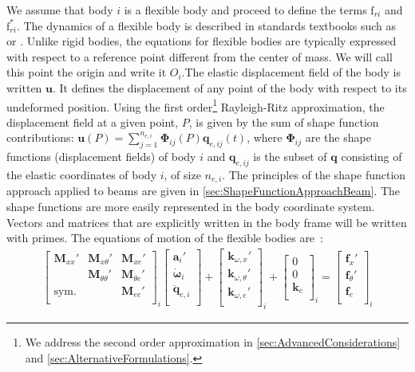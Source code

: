 \documentclass[wes, manuscript]{copernicus}
\renewcommand{\v}[1]{\boldsymbol{#1}}
\newcommand{\m}[1]{\boldsymbol{#1}}
\newcommand{\M} {{\m{M}}}
\newcommand{\kanef}{\mathrm{f}}
\begin{document}
We assume that body $i$ is a flexible body and proceed to define the terms $\kanef_{ri}$ and $\kanef_{ri}^*$.
The dynamics of a flexible body is described in standards textbooks 
such as \cite{shabana:book} or \cite{Schwertassek:book}.
Unlike rigid bodies, the equations for flexible bodies are typically expressed with respect to a reference point different from the center of mass. We will call this point the origin and write it $O_i$.The elastic displacement field of the body is written $\v{u}$. It defines the displacement of any point of the body with respect to its undeformed position. Using the first order\footnote{We address the second order approximation in \autoref{sec:AdvancedConsiderations} and \autoref{sec:AlternativeFormulations}.} Rayleigh-Ritz approximation, the displacement field at a given point, $P$, is given by the sum of shape function contributions: $\v{u}(P)=\sum_{j=1}^{n_{e,i}} \v{\Phi}_{ij}(P) \v{q}_{e,ij}(t)$, where $\m{\Phi}_{ij}$ are the shape functions (displacement fields) of body $i$ and $\v{q}_{e,ij}$ is the subset of $\v{q}$ consisting of the elastic coordinates of body $i$, of size $n_{e,i}$. The principles of the shape function approach applied to beams are given in \autoref{sec:ShapeFunctionApproachBeam}. The shape functions are more easily represented in the body coordinate system.  
Vectors and matrices that are explicitly written in the body frame will be written with primes.
The equations of motion of the flexible bodies are~\citep{Wallrapp:1994}:
\begin{align}
    \begin{bmatrix}
       \M_{xx}'    & \M_{x \theta}' & \M_{ x e }' \\
                   & \M_{\theta \theta}'   & \M_{\theta e}'   \\
       \text{sym.} &            & \M_{e e}'  \\
    \end{bmatrix}_i
    \begin{bmatrix}
      \v{a}_i' \\
      \v{\dot{\omega}}_i \\
      \v{\ddot{q}}_{e,i} \\
    \end{bmatrix}
      +
    \begin{bmatrix}
      \v{k}_{\omega, x}' \\
      \v{k}_{\omega, \theta}' \\
      \v{k}_{\omega, e}' \\
    \end{bmatrix}_i
      +
    \begin{bmatrix}
      0 \\
      0 \\
      \v{k}_{e}\\
    \end{bmatrix}_i
      =
    \begin{bmatrix}
      \v{f}_{x}' \\
      \v{f}_{\theta}' \\
      \v{f}_{e}\\
    \end{bmatrix}_i
    \label{eq:EOMFlexibleBody}
\end{align}
\end{document}
